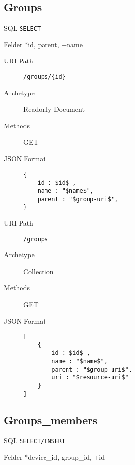 \documentclass[10pt,a4paper]{scrartcl}
\begin{document}
\pagebreak
\subsection{Groups}

\begin{description*}
    \item[SQL] \texttt{SELECT}
    \item[Felder] *id, parent, +name
\end{description*}


\begin{mdframed}[style=def]
\begin{description}
	\item[URI Path] \texttt{/groups/\{id\}}
	\item[Archetype] Readonly Document
	\item[Methods] GET
	\item[JSON Format] \hfill
\begin{lstlisting}
{
	id : $id$ ,
	name : "$name$",
	parent : "$group-uri$",
}
\end{lstlisting}
\end{description}
\end{mdframed}

\begin{mdframed}[style=def]
\begin{description}
	\item[URI Path] \texttt{/groups}
	\item[Archetype] Collection
	\item[Methods] GET
	\item[JSON Format] \hfill
\begin{lstlisting}
[
    {
	    id : $id$ ,
	    name : "$name$",
	    parent : "$group-uri$",
	    uri : "$resource-uri$"
    }
]
\end{lstlisting}
\end{description}
\end{mdframed}


\pagebreak
\subsection{Groups\_members}

\begin{description*}
    \item[SQL] \texttt{SELECT/INSERT}
    \item[Felder] *device\_id, group\_id, +id
\end{description*}
\end{document}
